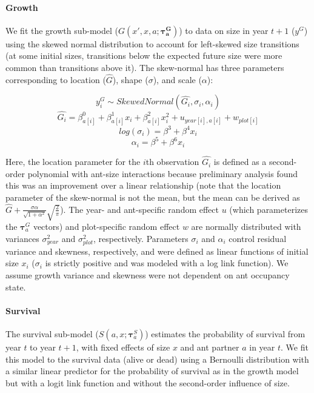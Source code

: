\documentclass[11pt]{article}
\begin{document}
\paragraph{Growth}
We fit the growth sub-model ($G(x',x,a;\pmb{\tau^G_{a}})$) to data on size in year $t+1$ ($y^G$) using the skewed normal distribution to account for left-skewed size transitions (at some initial sizes, transitions below the expected future size were more common than transitions above it). 
The skew-normal has three parameters corresponding to location ($\hat{G}$), shape ($\sigma$), and scale ($\alpha$):
\begin{linenomath*}
	$$y_i^G \sim Skewed Normal(\hat{G_i},\sigma_i,\alpha_i) $$
	$$\hat{G_i} = \beta^0_{a[i]} + \beta^1_{a[i]} x_i + \beta^2_{a[i]} x_i^2 + u_{year[i],a[i]} + w_{plot[i]} $$
	$$log(\sigma_i)  = \beta^3 + \beta^4 x_i $$
	$$\alpha_i = \beta^5 + \beta^6 x_i$$
	\label{eqn:growth}
\end{linenomath*}
Here, the location parameter for the $i$th observation $\hat{G_i}$ is defined as a second-order polynomial with ant-size interactions because  preliminary analysis found this was an improvement over a linear relationship (note that the location parameter of the skew-normal is not the mean, but the mean can be derived as $\hat{G} + \frac{\sigma\alpha}{\sqrt{1+\alpha^2}} \sqrt{\frac{2}{\pi}}$). 
The year- and ant-specific random effect $u$ (which parameterizes the $\pmb{\tau}^G_{a}$ vectors) and plot-specific random effect $w$ are normally distributed with variances $\sigma^2_{year}$ and $\sigma^2_{plot}$, respectively. 
Parameters $\sigma_i$ and $\alpha_i$  control residual variance and skewness, respectively, and were defined as linear functions of initial size $x_i$ ($\sigma_i$ is strictly positive and was modeled with a log link function). 
We assume growth variance and skewness were not dependent on ant occupancy state. 

\paragraph{Survival}
The survival sub-model ($S(a,x;\pmb{\tau}_{a}^{S})$) estimates the probability of survival from year $t$ to year $t+1$, with fixed effects of size $x$ and ant partner $a$ in year $t$.
We fit this model to the survival data (alive or dead) using a Bernoulli distribution with a similar linear predictor for the probability of survival as in the growth model but with a logit link function and without the second-order influence of size.
\end{document}
